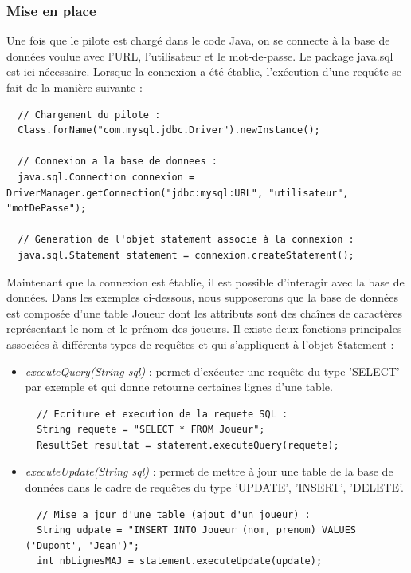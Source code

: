 \subsubsection{Mise en place}

Une fois que le pilote est chargé dans le code Java, on se connecte à la base de données voulue avec l'URL, l'utilisateur et le mot-de-passe. Le package java.sql est ici nécessaire. Lorsque la connexion a été établie, l'exécution d'une requête se fait de la manière suivante :
\begin{lstlisting}
  // Chargement du pilote :
  Class.forName("com.mysql.jdbc.Driver").newInstance();
  
  // Connexion a la base de donnees :
  java.sql.Connection connexion =  DriverManager.getConnection("jdbc:mysql:URL", "utilisateur", "motDePasse");
  
  // Generation de l'objet statement associe à la connexion :
  java.sql.Statement statement = connexion.createStatement();
\end{lstlisting}  
  
Maintenant que la connexion est établie, il est possible d'interagir avec la base de données. Dans les exemples ci-dessous, nous supposerons que la base de données est composée d'une table Joueur dont les attributs sont des chaînes de caractères représentant le nom et le prénom des joueurs. Il existe deux fonctions principales associées à différents types de requêtes et qui s'appliquent à l'objet Statement :
\begin{itemize}
 \item \textit{executeQuery(String sql)} : permet d'exécuter une requête du type 'SELECT' par exemple et qui donne retourne certaines lignes d'une table.
\begin{lstlisting}  
  // Ecriture et execution de la requete SQL :
  String requete = "SELECT * FROM Joueur";
  ResultSet resultat = statement.executeQuery(requete);
\end{lstlisting}
 \item \textit{executeUpdate(String sql)} : permet de mettre à jour une table de la base de données dans le cadre de requêtes du type 'UPDATE', 'INSERT', 'DELETE'.
\begin{lstlisting}
  // Mise a jour d'une table (ajout d'un joueur) :
  String udpate = "INSERT INTO Joueur (nom, prenom) VALUES ('Dupont', 'Jean')";
  int nbLignesMAJ = statement.executeUpdate(update);
\end{lstlisting}
\end{itemize}

